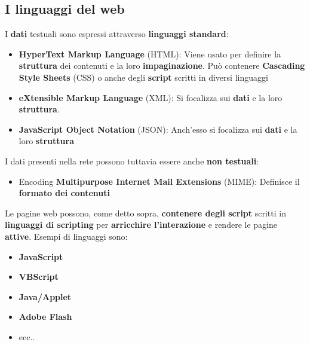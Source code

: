 \documentclass[12pt]{article}
\begin{document}
\subsection{I linguaggi del web}
I \textbf{dati} testuali sono espressi attraverso \textbf{linguaggi standard}:
\begin{itemize}
    \item \textbf{HyperText Markup Language} (HTML): Viene usato per definire la \textbf{struttura} dei contenuti e la loro \textbf{impaginazione}. Può contenere \textbf{Cascading Style Sheets} (CSS) o anche degli \textbf{script} scritti in diversi linguaggi
    \item \textbf{eXtensible Markup Language} (XML): Si focalizza sui \textbf{dati} e la loro \textbf{struttura}.
    \item \textbf{JavaScript Object Notation} (JSON): Anch'esso si focalizza sui \textbf{dati} e la loro \textbf{struttura}
\end{itemize}
I dati presenti nella rete possono tuttavia essere anche \textbf{non testuali}:
\begin{itemize}
    \item Encoding \textbf{Multipurpose Internet Mail Extensions} (MIME): Definisce il \textbf{formato dei contenuti}
\end{itemize}
Le pagine web possono, come detto sopra, \textbf{contenere degli script} scritti in \textbf{linguaggi di scripting} per \textbf{arricchire l'interazione} e rendere le pagine \textbf{attive}. Esempi di linguaggi sono:
\begin{itemize}
    \item \textbf{JavaScript}
    \item \textbf{VBScript}
    \item \textbf{Java/Applet}
    \item \textbf{Adobe Flash}
    \item ecc..
\end{itemize}
\end{document}

